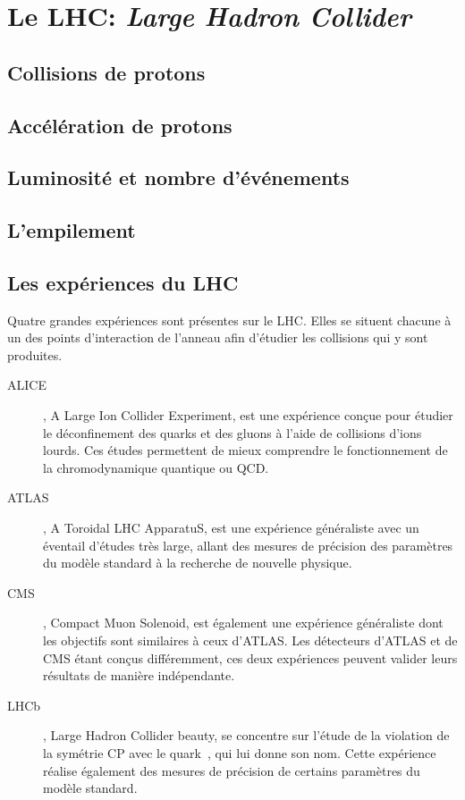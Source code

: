 \section{Le LHC: \emph{Large Hadron Collider}}\label{chapter-LHC-section-LHC}

\subsection{Collisions de protons}\label{chapter-LHC-section-LHC-subsec-pp_collisions}

\subsection{Accélération de protons}\label{chapter-LHC-section-LHC-subsec-pp_acceleration}

\subsection{Luminosité et nombre d'événements}\label{chapter-LHC-section-LHC-subsec-lumi}

\subsection{L'empilement}\label{chapter-LHC-section-LHC-subsec-PU}

\subsection{Les expériences du LHC}\label{chapter-LHC-section-LHC-subsec-experiments}
Quatre grandes expériences sont présentes sur le LHC. Elles se situent chacune à un des points d'interaction de l'anneau afin d'étudier les collisions qui y sont produites.
\begin{description}
\item[ALICE]\cite{alice_paper}, A Large Ion Collider Experiment, est une expérience conçue pour étudier le déconfinement des quarks et des gluons à l'aide de collisions d'ions lourds. Ces études permettent de mieux comprendre le fonctionnement de la chromodynamique quantique ou QCD.
\item[ATLAS]\cite{atlas_paper}, A Toroidal LHC ApparatuS, est une expérience généraliste avec un éventail d'études très large, allant des mesures de précision des paramètres du modèle standard à la recherche de nouvelle physique.
\item[CMS]\cite{cms_paper}, Compact Muon Solenoid, est également une expérience généraliste dont les objectifs sont similaires à ceux d'ATLAS. Les détecteurs d'ATLAS et de CMS étant conçus différemment, ces deux expériences peuvent valider leurs résultats de manière indépendante.
\item[LHCb]\cite{lhcb_paper}, Large Hadron Collider beauty, se concentre sur l'étude de la violation de la symétrie CP avec le quark~\quarkb, qui lui donne son nom. Cette expérience réalise également des mesures de précision de certains paramètres du modèle standard.
\end{description}

